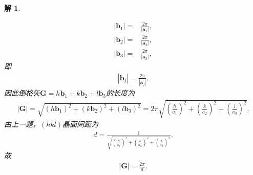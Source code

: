\documentclass[UTF8,10pt,a4paper]{article}
\theoremstyle{Problem}
\theoremstyle{Solution}
\newtheorem*{sol}{解}
\providecommand{\abs}[1]{\left\lvert#1\right\rvert}
\begin{document}
\begin{sol}
\begin{enumerate}
\begin{align*}
            \abs{\bm{b}_1}=&\frac{2\pi}{\abs{\bm{a}_1}},\\
            \abs{\bm{b}_2}=&\frac{2\pi}{\abs{\bm{a}_2}},\\
            \abs{\bm{b}_3}=&\frac{2\pi}{\abs{\bm{a}_3}},
        \end{align*}
        即
        \begin{align}
            \abs{\bm{b}_j}=\frac{2\pi}{\abs{\bm{a}_j}}.
        \end{align}
        因此倒格矢$\bm{G}=h\bm{b}_1+k\bm{b}_2+l\bm{b}_3$的长度为
        \begin{align}
            \abs{\bm{G}}=\sqrt{(h\bm{b}_1)^2+(k\bm{b}_2)^2+(l\bm{b}_3)^2}=2\pi\sqrt{\left(\frac{h}{a_1}\right)^2+\left(\frac{k}{a_2}\right)^2+\left(\frac{l}{a_3}\right)^2}.
        \end{align}
        由上一题，$(hkl)$晶面间距为
        \begin{align}
            d=\frac{1}{\sqrt{\left(\frac{h}{a_1}\right)^2+\left(\frac{k}{a_2}\right)^2+\left(\frac{l}{a_3}\right)^2}}.
        \end{align}
        故
        \begin{align}
            \abs{\bm{G}}=\frac{2\pi}{d}.
        \end{align}
    \end{enumerate}
\end{sol}
\end{document}
